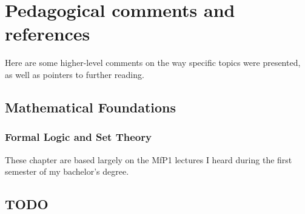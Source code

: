 \chapter{Pedagogical comments and references}\label{ch:refs}
Here are some higher-level comments on the way specific topics were presented,
as well as pointers to further reading.

\section{Mathematical Foundations}
\subsection{Formal Logic and Set Theory}

These chapter are based largely on the MfP1\cite{ref:mfp1} lectures I heard
during the first semester of my bachelor's degree.

\section{TODO}
